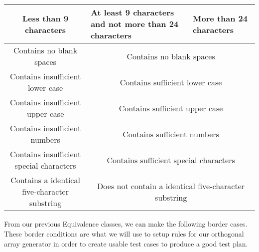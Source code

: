 \documentclass[12pt,letterpaper]{article}
\begin{document}
\subsection{}

\begin{center}

    
  \begin{tabular}{||c|m{4cm}|m{5cm}||}
  \hline
  Less than 9 characters & At least 9 characters and not more than 24
  characters & More than 24 characters \\
  
  \hline \hline
  \multicolumn{1}{||c|}{Contains no blank spaces} & \multicolumn{2}{c||}{Contains no blank spaces} \\
  
  \hline \hline
  \multicolumn{1}{||c|}{Contains insufficient lower case} 
  & \multicolumn{2}{c||}{Contains sufficient lower case} \\
  
  \hline \hline
  \multicolumn{1}{||c|}{Contains insufficient upper case} 
  & \multicolumn{2}{c||}{Contains sufficient upper case} \\
  
  \hline \hline
  \multicolumn{1}{||c|}{Contains insufficient numbers} 
  & \multicolumn{2}{c||}{Contains sufficient numbers} \\
  
  \hline \hline
  \multicolumn{1}{||c|}{Contains insufficient special characters} 
  & \multicolumn{2}{c||}{Contains sufficient special characters} \\
   
  \hline \hline
  \multicolumn{1}{||c|}{Contains a identical five-character substring}
  & \multicolumn{2}{c||}{Does not contain a identical five-character substring} \\
  \hline
  \end{tabular}
\end{center}
  
From our previous Equivalence classes, we can make the following border cases. These border conditions
are what we will use to setup rules for our orthogonal array generator in order to create usable test
cases to produce a good test plan.
\end{document}
